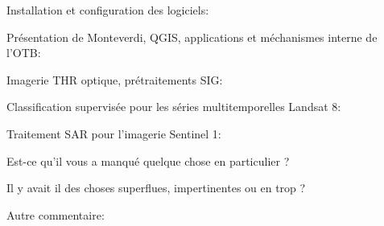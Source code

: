 \documentclass[10pt,a4paper]{article}
\begin{document}
Installation et configuration des logiciels:
\moduleanswer

Présentation de Monteverdi, QGIS, applications et méchanismes interne de l'OTB:
\moduleanswer

Imagerie THR optique, prétraitements SIG:
\moduleanswer

Classification supervisée pour les séries multitemporelles Landsat 8:
\moduleanswer

Traitement SAR pour l'imagerie Sentinel 1:
\moduleanswer

Est-ce qu'il vous a manqué quelque chose en particulier ?
\vspace{10em}

Il y avait il des choses superflues, impertinentes ou en trop ?
\vspace{10em}

Autre commentaire:
\vspace{10em}
\end{document}
